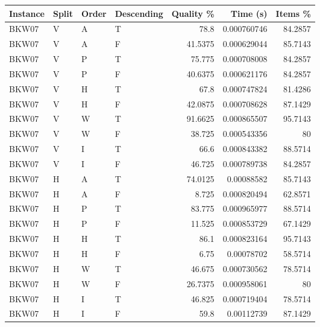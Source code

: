 \begin{tabular}{llllrrr}
    \hline
    Instance & Split & Order & Descending & Quality \% & Time (s)    & Items \% \\
    \hline
    BKW07    & V     & A     & T          & 78.8       & 0.000760746 & 84.2857  \\
    BKW07    & V     & A     & F          & 41.5375    & 0.000629044 & 85.7143  \\
    BKW07    & V     & P     & T          & 75.775     & 0.000708008 & 84.2857  \\
    BKW07    & V     & P     & F          & 40.6375    & 0.000621176 & 84.2857  \\
    BKW07    & V     & H     & T          & 67.8       & 0.000747824 & 81.4286  \\
    BKW07    & V     & H     & F          & 42.0875    & 0.000708628 & 87.1429  \\
    BKW07    & V     & W     & T          & 91.6625    & 0.000865507 & 95.7143  \\
    BKW07    & V     & W     & F          & 38.725     & 0.000543356 & 80       \\
    BKW07    & V     & I     & T          & 66.6       & 0.000843382 & 88.5714  \\
    BKW07    & V     & I     & F          & 46.725     & 0.000789738 & 84.2857  \\
    BKW07    & H     & A     & T          & 74.0125    & 0.00088582  & 85.7143  \\
    BKW07    & H     & A     & F          & 8.725      & 0.000820494 & 62.8571  \\
    BKW07    & H     & P     & T          & 83.775     & 0.000965977 & 88.5714  \\
    BKW07    & H     & P     & F          & 11.525     & 0.000853729 & 67.1429  \\
    BKW07    & H     & H     & T          & 86.1       & 0.000823164 & 95.7143  \\
    BKW07    & H     & H     & F          & 6.75       & 0.00078702  & 58.5714  \\
    BKW07    & H     & W     & T          & 46.675     & 0.000730562 & 78.5714  \\
    BKW07    & H     & W     & F          & 26.7375    & 0.000958061 & 80       \\
    BKW07    & H     & I     & T          & 46.825     & 0.000719404 & 78.5714  \\
    BKW07    & H     & I     & F          & 59.8       & 0.00112739  & 87.1429  \\

\end{tabular}
